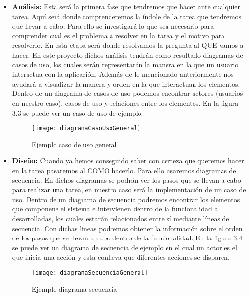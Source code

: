 \begin{itemize}
  \item \textbf{Análisis:} Esta será la primera fase que tendremos que hacer ante cualquier tarea.
     Aquí será donde comprenderemos la índole de la tarea que tendremos que llevar a cabo. Para ello
     se investigará lo que sea necesario para comprender cual es el problema a resolver en la tarea
     y el motivo para resolverlo. En esta etapa será donde resolvamos la pregunta al QUE vamos
     a hacer. En este proyecto dichos análisis tendrán como resultado diagramas de casos de uso, los
     cuales serán representarán la manera en la que un usuario interactua con la aplicación. Además
     de lo mencionado anteriormente nos ayudará a visualizar la manera y orden en la que interactuan
     los elementos. Dentro de un diagrama de casos de uso podemos encontrar actores (usuarios en nuestro caso),
     casos de uso y relaciones entre los elementos. En la figura 3.3 se puede ver un caso
     de uso de ejemplo.

     \begin{figure}[htb]
       \centering
       \texttt{[image: diagramaCasoUsoGeneral]}
       \caption[Ejemplo caso de uso general]{Ejemplo caso de uso general}
       \label{fig:Ejemplo caso de uso general}
     \end{figure}

   \newpage

  \item \textbf{Diseño:} Cuando ya hemos conseguido saber con certeza que queremos hacer en la tarea
     pasaremos al COMO hacerlo. Para ello usaremos diagramas de secuencia. En dichos diagramas se podrán
     ver los pasos que se llevan a cabo para realizar una tarea, en nuestro caso será la implementación de un
     caso de uso. Dentro de un diagrama de secuencia podremos encontrar los elementos que componene el sistema
     e intervienen dentro de la funcionalidad a desarrolladas, los cuales estarán relacionados entre sí mediante
     líneas de secuencia. Con dichas líneas podremos obtener la información sobre el orden de los pasos que
     se llevan a cabo dentro de la funcionalidad. En la figura 3.4 se puede ver un diagrama de secuencia de
     ejemplo en el cual un actor es el que inicia una acción y esta conlleva que diferentes acciones se disparen.

     \begin{figure}[htb]
       \centering
       \texttt{[image: diagramaSecuenciaGeneral]}
       \caption[Ejemplo diagrama secuencia]{Ejemplo diagrama secuencia}
       \label{fig:Ejemplo diagrama secuencia}
     \end{figure}

\end{itemize}
